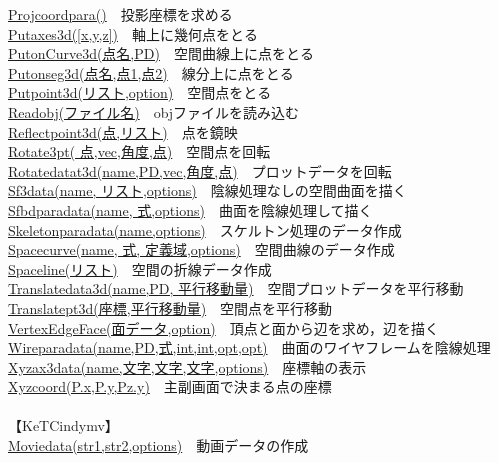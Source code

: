 \documentclass[papersize,a4paper,12pt,uplatex]{jsarticle}
\begin{document}
\begin{tabbing}
\hyperlink{projcoordpara}{Projcoordpara()}　\>投影座標を求める\\
\hyperlink{putaxes3d}{Putaxes3d([x,y,z])}　\>軸上に幾何点をとる\\
\hyperlink{putonCurve3d}{PutonCurve3d(点名,PD)}　\>空間曲線上に点をとる\\
\hyperlink{putonseg3d}{Putonseg3d(点名,点1,点2)}　\>線分上に点をとる\\
\hyperlink{putpoint3d}{Putpoint3d(リスト,option)}　\>空間点をとる\\
\hyperlink{readobj}{Readobj(ファイル名)}　\>objファイルを読み込む\\
\hyperlink{reflectpoint3d}{Reflectpoint3d(点,リスト)}　\>点を鏡映\\
\hyperlink{rotate3pt}{Rotate3pt( 点,vec,角度,点)}　\>空間点を回転\\
\hyperlink{rotatedata3d}{Rotatedatat3d(name,PD,vec,角度,点)}　\>プロットデータを回転\\
\hyperlink{sf3data}{Sf3data(name, リスト,options)}　\>陰線処理なしの空間曲面を描く\\
\hyperlink{sfbdparadata}{Sfbdparadata(name, 式,options)}　\>曲面を陰線処理して描く\\
\hyperlink{skeletonparadata}{Skeletonparadata(name,options)}　\>スケルトン処理のデータ作成\\
\hyperlink{spacecurve}{Spacecurve(name, 式, 定義域,options)}　\>空間曲線のデータ作成\\
\hyperlink{spaceline}{Spaceline(リスト)}　\>空間の折線データ作成\\
\hyperlink{translatedata3d}{Translatedata3d(name,PD, 平行移動量)}　\>空間プロットデータを平行移動\\
\hyperlink{translatept3d}{Translatept3d(座標,平行移動量)}　\>空間点を平行移動\\
\hyperlink{vertexedgeface}{VertexEdgeFace(面データ,option)}　\>頂点と面から辺を求め，辺を描く\\
\hyperlink{wireparadata}{Wireparadata(name,PD,式,int,int,opt,opt)}　\>曲面のワイヤフレームを陰線処理\\
\hyperlink{xyzax3data}{Xyzax3data(name,文字,文字,文字,options)}　\>座標軸の表示\\
\hyperlink{xyzcoord}{Xyzcoord(P.x,P.y,Pz.y)}　\>主副画面で決まる点の座標\\
　\\
【KeTCindymv】\\
\hyperlink{moviedata}{Moviedata(str1,str2,options)}　\>動画データの作成\\
\end{tabbing}


\end{document}
